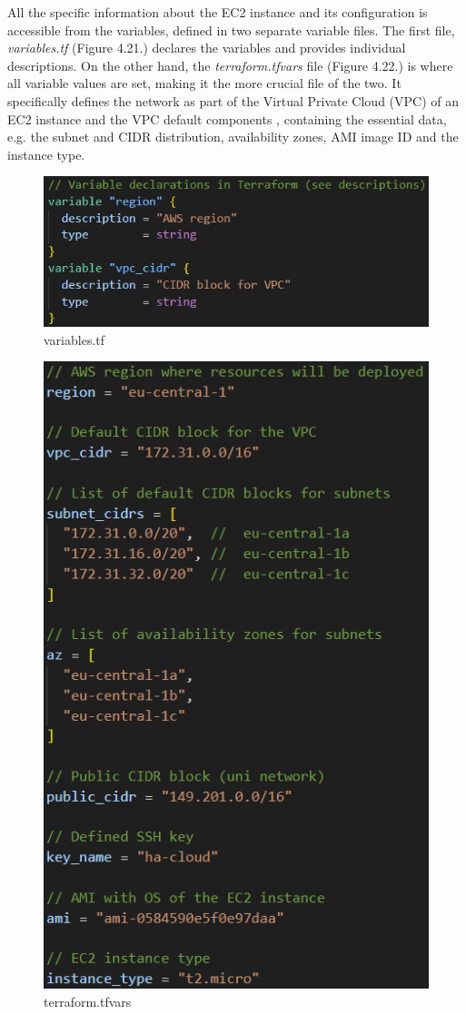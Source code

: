 All the specific information about the EC2 instance and its configuration is accessible from the variables, defined in two separate variable files. The first file, \textit{variables.tf} (Figure 4.21.) declares the variables and provides individual descriptions. On the other hand, the \textit{terraform.tfvars} file (Figure 4.22.) is where all variable values are set, making it the more crucial file of the two. It specifically defines the network as part of the Virtual Private Cloud (VPC) of an EC2 instance and the VPC default components \cite{tf_vpc_components}, containing the essential data, e.g. the subnet and CIDR distribution, availability zones, AMI image ID and the instance type.
\begin{figure}[H]
	\centering
	\includegraphics[width=0.7 \linewidth]{Images/K4/Picture32.png}
	\caption{variables.tf}
	\label{fig:var_tf}
\end{figure}
\begin{figure}[H]
	\centering
	\includegraphics[width=0.5 \linewidth]{Images/K4/Picture33.png}
	\caption{terraform.tfvars}
	\label{fig:tf_vars}
\end{figure}

